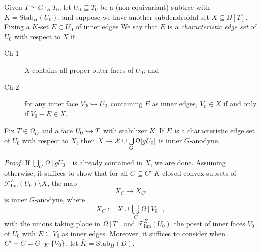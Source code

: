\documentclass[a4paper,10pt,draft]{article}%
\begin{document}
{\color{blue}
\begin{definition}
      Given $T \simeq G \cdot_H T_0$,
      let $U_0 \subseteq T_0$ be a (non-equivariant) subtree
      with $K = \mathrm{Stab}_H(U_0)$,
      and suppose we have another subdendroidal set $X \subseteq \Omega[T]$.
      Fixing a $K$-set $E \subset U_0$ of inner edges
      We say that $E$ is a \textit{characteristic edge set} of
      $U_0$ with respect to $X$
      if
      \begin{description}
      \item[Ch 1] $X$ contains all proper outer faces of $U_0$; and
      \item[Ch 2] for any inner face $V_0 \hookrightarrow U_0$ containing $E$ as inner edges,
            $V_0 \in X$
            if and only if
            $V_0 - E \in X$.
      \end{description}
\end{definition}

\begin{proposition}
      \label{CHAR_HORN_THM}
      Fix $T \in \Omega_G$ and 
      a face $U_0 \hookrightarrow T$ with stabilizer $K$.      
      If $E$ is a characteristic edge set of $U_0$ with respect to $X$, then
      $X \to \mathcal{X} \cup \mathop{\bigcup}\limits_{G}\Omega[g U_0]$
      is inner $G$-anodyne.
\end{proposition}
\begin{proof}
      If
      $\bigcup_G \Omega[g U_0]$ is already contained in $X$, we are done.
      Assuming otherwise, it suffices to show that for all
      $C \subseteq C'$ $K$-closed convex subsets of $\mathscr{F}_{\mathrm{Inn}}^{E}(U_0) \setminus X$, the map
      \begin{equation}
            \label{CHAR_HORN_EQ}
            X_C \to X_{C'}
      \end{equation}
      is inner $G$-anodyne,
      where
      \begin{equation}
            X_C
            := X \cup \mathop{\bigcup}\limits_{C}\Omega[V_0],
      \end{equation}
      with the unions taking place in $\Omega[T]$
      and $\mathscr{F}_{\mathrm{Inn}}^{E}(U_0)$ the poset of inner faces $V_0$ of $U_0$
      with $E \subseteq V_0$ as inner edges.
      Moreover, it suffices to consider when $C' - C = G\cdot_K \left\{V_0\right\}$;
      let $\bar K = \mathrm{Stab}_H(D)$.


\end{proof}}
\end{document}
